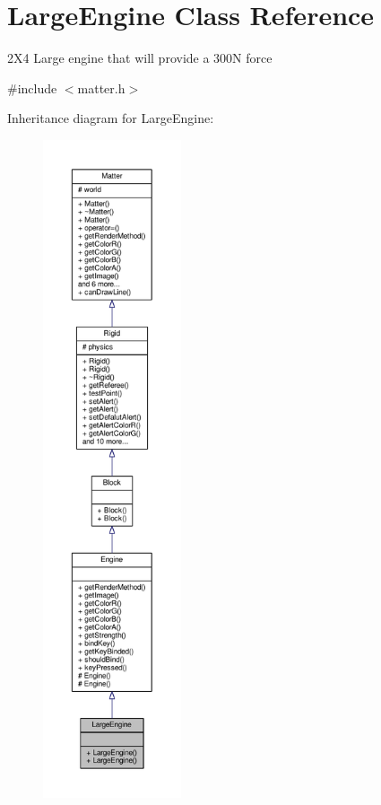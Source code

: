 \hypertarget{classLargeEngine}{}\section{Large\+Engine Class Reference}
\label{classLargeEngine}


2\+X4 Large engine that will provide a 300\+N force  




{\ttfamily \#include $<$matter.\+h$>$}



Inheritance diagram for Large\+Engine\+:\nopagebreak
\begin{figure}[H]
\begin{center}
\leavevmode
\includegraphics[height=550pt]{classLargeEngine__inherit__graph}
\end{center}
\end{figure}


